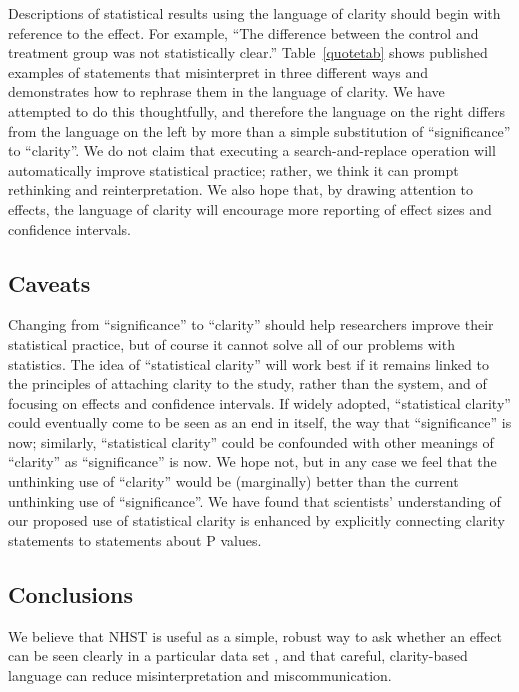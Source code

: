 Descriptions of statistical results using the language of clarity should begin with reference to the effect. For example, ``The difference between the control and treatment group was not statistically clear.'' Table~\ref{quotetab} shows published examples of statements that misinterpret \pvals in three different ways and demonstrates how to rephrase them in the language of clarity. We have attempted to do this thoughtfully, and therefore the language on the right differs from the language on the left by more than a simple substitution of ``significance'' to ``clarity''. We do not claim that executing a search-and-replace operation will automatically improve statistical practice; rather, we think it can prompt rethinking and reinterpretation. We also hope that, by drawing attention to effects, the language of clarity will encourage more reporting of effect sizes and confidence intervals.

\subsection*{Caveats}

Changing from ``significance'' to ``clarity'' should help researchers improve their statistical practice, but of course it cannot solve all of our problems with statistics. The idea of ``statistical clarity'' will work best if it remains linked to the principles of attaching clarity to the study, rather than the system, and of focusing on effects and confidence intervals. If widely adopted, ``statistical clarity'' could eventually come to be seen as an end in itself, the way that ``significance'' is now; similarly, ``statistical clarity'' could be confounded with other meanings of  ``clarity'' as ``significance'' is now. We hope not, but in any case we feel that the unthinking use of ``clarity'' would be (marginally) better than the current unthinking use of ``significance''. We have found that scientists' understanding of our proposed use of statistical clarity is enhanced by explicitly connecting clarity statements to statements about P values.


\subsection*{Conclusions}

\noindent We believe that NHST is useful as a simple, robust way to ask whether an effect can be seen clearly in a particular data set \citep{robinson2001past}, and that careful, clarity-based language can reduce misinterpretation and miscommunication.

